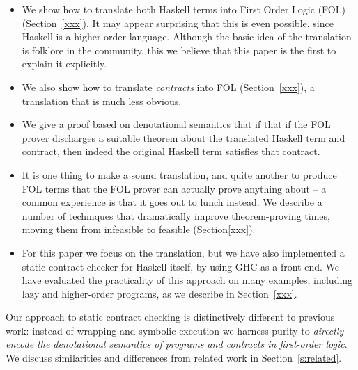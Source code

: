 \begin{itemize}
\item We show how to translate both Haskell terms
into First Order Logic (FOL) (Section~\ref{xxx}).  It may appear surprising that this 
is even possible, since Haskell is a higher order language.  Although
the basic idea of the translation is folklore in the community,
this we believe that this paper is the first to explain it explicitly.

\item We also show how to translate \emph{contracts} into FOL
      (Section~\ref{xxx}), a translation that is much less obvious.

\item We give a proof based on denotational semantics 
that if that if the FOL prover discharges a 
suitable theorem about the translated Haskell term and contract, 
then indeed the original Haskell term satisfies that contract.

\item It is one thing to make a sound translation, and quite another
to produce FOL terms that the FOL prover can actually prove anything
about -- a common experience is that it goes out to lunch instead.  We
describe a number of techniques that dramatically improve
theorem-proving times, moving them from infeasible to feasible (Section\ref{xxx}).

\item For this paper we focus on the
translation, but we have also implemented a static contract checker
for Haskell itself, by using GHC as a front end.  We have evaluated
the practicality of this approach on many examples, including lazy and
higher-order programs, as we describe in Section~\ref{xxx}.  
\end{itemize}
Our approach to static contract checking is distinctively different to
previous work: instead of wrapping and symbolic execution we harness
purity to \emph{directly encode the denotational semantics of programs
and contracts in first-order logic}.  We discuss similarities and differences from
related work in Section~\ref{s:related}.


















